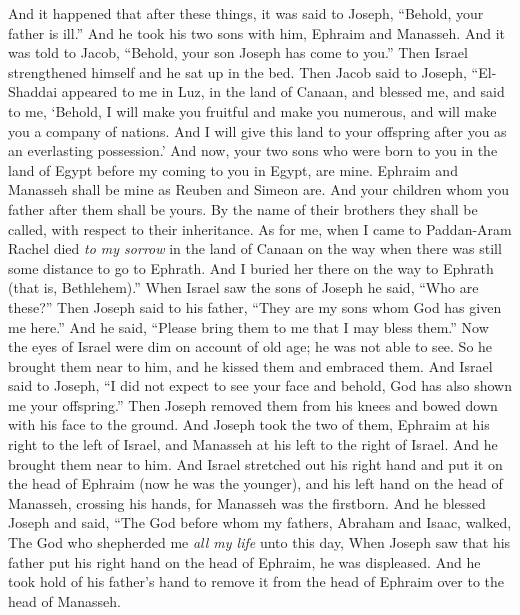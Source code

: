 \begin{biblechapter} %
 And it happened that after these things, it was said to Joseph, “Behold, your father is ill.” And he took his two sons with him, Ephraim and Manasseh.
\verse And it was told to Jacob, “Behold, your son Joseph has come to you.” Then Israel strengthened himself and he sat up in the bed.
\verse Then Jacob said to Joseph, “El-Shaddai appeared to me in Luz, in the land of Canaan, and blessed me,
\verse and said to me, ‘Behold, I will make you fruitful and make you numerous, and will make you a company of nations. And I will give this land to your offspring after you as an everlasting possession.’
\verse And now, your two sons who were born to you in the land of Egypt before my coming to you in Egypt, are mine. Ephraim and Manasseh shall be mine as Reuben and Simeon are.
\verse And your children whom you father after them shall be yours. By the name of their brothers they shall be called, with respect to their inheritance.
\verse As for me, when I came to Paddan-Aram Rachel died \textit{to my sorrow} in the land of Canaan on the way when there was still some distance to go to Ephrath. And I buried her there on the way to Ephrath (that is, Bethlehem).”
\verse When Israel saw the sons of Joseph he said, “Who are these?”
\verse Then Joseph said to his father, “They are my sons whom God has given me here.” And he said, “Please bring them to me that I may bless them.”
\verse Now the eyes of Israel were dim on account of old age; he was not able to see. So he brought them near to him, and he kissed them and embraced them.
\verse And Israel said to Joseph, “I did not expect to see your face and behold, God has also shown me your offspring.”
\verse Then Joseph removed them from his knees and bowed down with his face to the ground.
\verse And Joseph took the two of them, Ephraim at his right to the left of Israel, and Manasseh at his left to the right of Israel. And he brought them near to him.
\verse And Israel stretched out his right hand and put it on the head of Ephraim (now he was the younger), and his left hand on the head of Manasseh, crossing his hands, for Manasseh was the firstborn.
\verse And he blessed Joseph and said,
\verse “The God before whom my fathers, Abraham and Isaac, walked, 
The God who shepherded me \textit{all my life} unto this day,
\verse When Joseph saw that his father put his right hand on the head of Ephraim, he was displeased. And he took hold of his father’s hand to remove it from the head of Ephraim over to the head of Manasseh.

\end{biblechapter}
